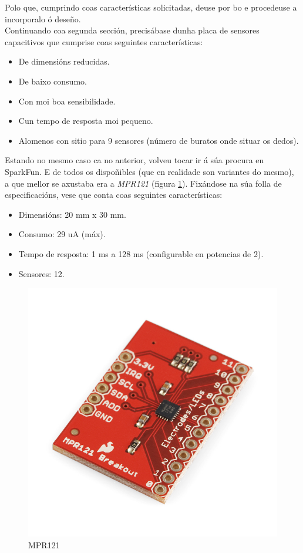  Polo que, cumprindo coas características solicitadas, deuse por bo e
  procedeuse a incorporalo ó deseño. \\

  Continuando coa segunda sección, precisábase dunha placa de sensores
  capacitivos que cumprise coas seguintes características:

  \begin{itemize}
   \item De dimensións reducidas.
   \item De baixo consumo.
   \item Con moi boa sensibilidade.
   \item Cun tempo de resposta moi pequeno.
   \item Alomenos con sitio para 9 sensores (número de buratos onde situar os
         dedos).
  \end{itemize}

  Estando no mesmo caso ca no anterior, volveu tocar ir á súa procura en
  SparkFun. E de todos os dispoñibles (que en realidade son variantes do
  mesmo), a que mellor se axustaba era a \textit{MPR121} \cite{MPR121}
  (figura \ref{figura:MPR121}). Fixándose na súa folla de especificacións, vese
  que conta coas seguintes características:

  \begin{itemize}
   \item Dimensións: 20 mm x 30 mm.
   \item Consumo: 29 uA (máx).
   \item Tempo de resposta: 1 ms a 128 ms (configurable en potencias de 2).
   \item Sensores: 12.
  \end{itemize}

  \begin{figure}[htbp]
   \centering
   \includegraphics[keepaspectratio=true]{./imagenes/mpr121.jpg}
   \caption{MPR121}
   \label{figura:MPR121}
  \end{figure}

